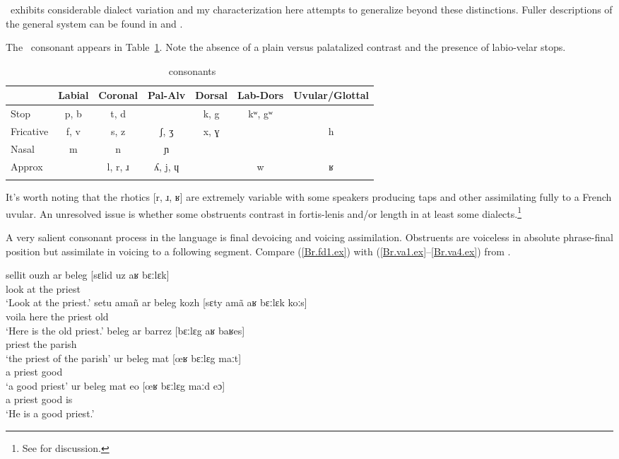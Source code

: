 \documentclass[output=paper,colorlinks,citecolor=brown]{langscibook}
\begin{document}
\br\ exhibits considerable dialect variation and my characterization here attempts to generalize beyond these distinctions. Fuller descriptions of the general system can be found in \citet{hemon} and \citet{press}.

The \br\ consonant  appears in Table~\ref{breton.consonants.tab}. Note the absence of a plain versus palatalized contrast and the presence of labio-velar stops.

\begin{table}
\caption{\br\ consonants}
\label{breton.consonants.tab}
\begin{tabular}[t]{lcccccc}
\lsptoprule
       & Labial & Coronal & Pal-Alv & Dorsal & Lab-Dors & Uvular/Glottal \\
\midrule
Stop   & p, b    & t, d     &         & k, g    & kʷ, gʷ     & \\
Fricative   & f, v    & s, z     & ʃ, ʒ     & x, ɣ    &          & h \\
Nasal  & m      & n       & ɲ       &        &          & \\
Approx &        & l, r, ɹ   & ʎ, j, ɥ   &        & w        & ʁ \\
\lspbottomrule
\end{tabular}
\end{table}

It's worth noting that the rhotics [r, ɹ, ʁ] are extremely variable with some speakers producing taps and other assimilating fully to a French uvular. An unresolved issue is whether some obstruents contrast in fortis-lenis and/or length in at least some dialects.\footnote{See \citet{press} for discussion.}

A very salient consonant process in the language is final devoicing and voicing assimilation. Obstruents are voiceless in absolute phrase-final position but assimilate in voicing to a following segment. Compare (\ref{Br.fd1.ex}) with (\ref{Br.va1.ex}--\ref{Br.va4.ex}) from \citet[79]{hemon}.

\ea\label{Br.fd1.ex}
\gll sellit ouzh ar  beleg {[sɛlid uz aʁ bɛːlɛk]} \\
     look   at   the priest \\
\glt `Look at the priest.'
\ex\label{Br.va1.ex}
\gll setu ama\~n ar beleg kozh {[sɛty am\~a aʁ bɛːlɛk koːs]} \\
     voila here   the priest old \\
\glt `Here is the old priest.'
\ex\label{Br.va2.ex}
\gll beleg  ar  barrez {[bɛːlɛg aʁ baʁes]} \\
     priest the parish \\
\glt `the priest of the parish'
\ex\label{Br.va3.ex}
\gll ur beleg  mat {[œʁ bɛːlɛg maːt]} \\
     a  priest good \\
\glt `a good priest'
\ex\label{Br.va4.ex}
\gll ur beleg  mat  eo {[œʁ bɛːlɛg maːd eɔ]} \\
     a  priest good is \\
\glt `He is a good priest.'
\z
\end{document}
